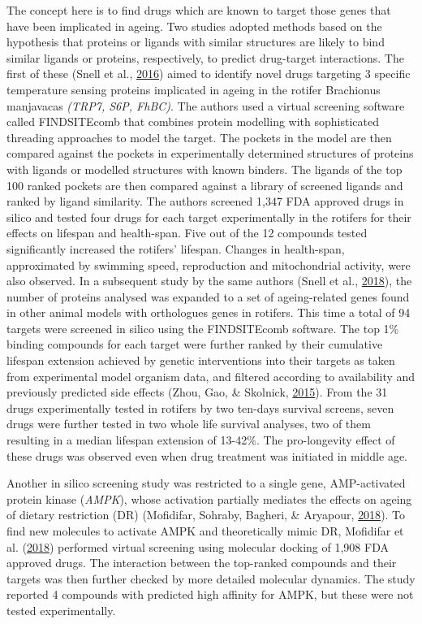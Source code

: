 \documentclass[12pt,twoside]{unicam}
\begin{document}
The concept here is to find drugs which are known to target those genes that have been implicated in ageing. Two studies adopted methods based on the hypothesis that proteins or ligands with similar structures are likely to bind similar ligands or proteins, respectively, to predict drug-target interactions. The first of these (Snell et al., \protect\hyperlink{ref-Snell2016}{2016}) aimed to identify novel drugs targeting 3 specific temperature sensing proteins implicated in ageing in the rotifer Brachionus manjavacas \emph{(TRP7, S6P, FhBC)}. The authors used a virtual screening software called FINDSITEcomb that combines protein modelling with sophisticated threading approaches to model the target. The pockets in the model are then compared against the pockets in experimentally determined structures of proteins with ligands or modelled structures with known binders. The ligands of the top 100 ranked pockets are then compared against a library of screened ligands and ranked by ligand similarity. The authors screened 1,347 FDA approved drugs in silico and tested four drugs for each target experimentally in the rotifers for their effects on lifespan and health-span. Five out of the 12 compounds tested significantly increased the rotifers' lifespan. Changes in health-span, approximated by swimming speed, reproduction and mitochondrial activity, were also observed. In a subsequent study by the same authors (Snell et al., \protect\hyperlink{ref-Snell2018}{2018}), the number of proteins analysed was expanded to a set of ageing-related genes found in other animal models with orthologues genes in rotifers. This time a total of 94 targets were screened in silico using the FINDSITEcomb software. The top 1\% binding compounds for each target were further ranked by their cumulative lifespan extension achieved by genetic interventions into their targets as taken from experimental model organism data, and filtered according to availability and previously predicted side effects (Zhou, Gao, \& Skolnick, \protect\hyperlink{ref-Zhou2015}{2015}). From the 31 drugs experimentally tested in rotifers by two ten-days survival screens, seven drugs were further tested in two whole life survival analyses, two of them resulting in a median lifespan extension of 13-42\%. The pro-longevity effect of these drugs was observed even when drug treatment was initiated in middle age.

Another in silico screening study was restricted to a single gene, AMP-activated protein kinase (\emph{AMPK}), whose activation partially mediates the effects on ageing of dietary restriction (DR) (Mofidifar, Sohraby, Bagheri, \& Aryapour, \protect\hyperlink{ref-Mofidifar2018}{2018}). To find new molecules to activate AMPK and theoretically mimic DR, Mofidifar et al. (\protect\hyperlink{ref-Mofidifar2018}{2018}) performed virtual screening using molecular docking of 1,908 FDA approved drugs. The interaction between the top-ranked compounds and their targets was then further checked by more detailed molecular dynamics. The study reported 4 compounds with predicted high affinity for AMPK, but these were not tested experimentally.
\end{document}
